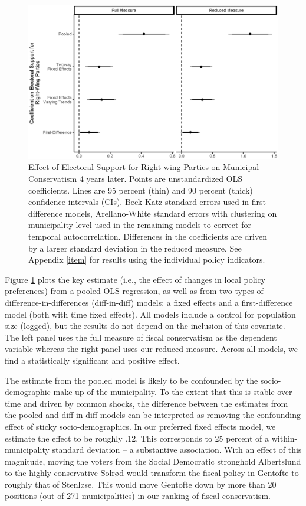 \documentclass[a4paper,12pt]{article}
\begin{document}
\begin{figure}[htbp]
	\centering
	\includegraphics[scale = 0.7]{CoefPlot_18092018.eps}
	\caption{Effect of Electoral Support for Right-wing Parties on Municipal Conservatism 4 years later. Points are unstandardized OLS coefficients. Lines are 95 percent (thin) and 90 percent (thick) confidence intervals (CIs). Beck-Katz standard errors used in first-difference models, Arellano-White standard errors with clustering on municipality level used in the remaining models to correct for temporal autocorrelation. Differences in the coefficients are driven by a larger standard deviation in the reduced measure. See Appendix \ref{item} for results using the individual policy indicators.}
	\label{fig:FourYearLead}
\end{figure}


Figure \ref{fig:FourYearLead} plots the key estimate (i.e., the effect of changes in local policy preferences) from a pooled OLS regression, as well as from two types of difference-in-differences (diff-in-diff) models: a fixed effects and a first-difference model (both with time fixed effects). All models include a control for population size (logged), but the results do not depend on the inclusion of this covariate.  The  left panel uses the full measure of fiscal conservatism as the dependent variable whereas the right panel uses our reduced measure. Across all models, we find a statistically significant and positive effect.

The estimate from the pooled model is likely to be confounded by the socio-demographic make-up of the municipality. To the extent that this is stable over time and driven by common shocks, the difference between the estimates from the pooled and diff-in-diff models can be interpreted as removing the confounding effect of sticky socio-demographics. In our preferred fixed effects model, we estimate the effect to be roughly .12. This corresponds to 25 percent of a within-municipality standard deviation -- a substantive association. With an effect of this magnitude, moving the voters from the Social Democratic stronghold Albertslund to the highly conservative Solrød would transform the fiscal policy in Gentofte to roughly that of Stenløse. This would move Gentofte down by more than 20 positions (out of 271 municipalities) in our ranking of fiscal conservatism. 
\end{document}

